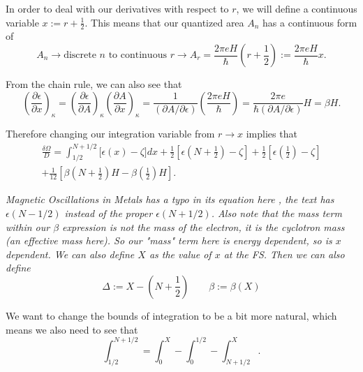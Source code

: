 \documentclass[12pt]{revtex4-2}
\begin{document}
In order to deal with our derivatives with respect to $r$, we will define a continuous variable $x := r + \frac{1}{2}$.  This means that our quantized area $A_n$ has a continuous form of
\begin{equation}
    A_n \to \text{discrete $n$ to continuous $r$} \to A_r = \frac{2\pi eH}{\hbar}\left( r + \frac{1}{2} \right) := \frac{2\pi eH}{\hbar}x.
\end{equation}

From the chain rule, we can also see that
\begin{equation}
    \left( \frac{\partial\epsilon}{\partial x} \right)_\kappa = \left( \frac{\partial\epsilon}{\partial A} \right)_\kappa \left( \frac{\partial A}{\partial x} \right)_\kappa = \frac{1}{(\partial A/\partial\epsilon)}\left( \frac{2\pi eH}{\hbar} \right) = \frac{2\pi e}{\hbar(\partial A/\partial\epsilon)}H = \beta H.
\end{equation}

Therefore changing our integration variable from $r \to x$ implies that 
\begin{multline}\label{eqn:dO-over-D-pre-expansion}
    \frac{\delta\Omega}{D} = \int_{1/2}^{N + 1/2} \big[ \epsilon(x) - \zeta \big]dx + \frac{1}{2}\left[ \epsilon\left(N + \frac{1}{2}\right) - \zeta \right] + \frac{1}{2}\left[ \epsilon\left(\frac{1}{2}\right) - \zeta \right] \\
    + \frac{1}{12}\left[ \beta\left(N + \frac{1}{2}\right)H - \beta\left(\frac{1}{2}\right)H \right].
\end{multline}

\em Magnetic Oscillations in Metals has a typo in its equation here \em, the text has $\epsilon(N - 1/2)$ instead of the proper $\epsilon(N+1/2)$.  Also note that the mass term within our $\beta$ expression is \em not \em the mass of the electron, it is the cyclotron mass (an effective mass here).  So our "mass" term here is energy dependent, so is $x$ dependent.  We can also define $X$ as the value of $x$ at the FS.  Then we can also define
\begin{equation}
    \Delta := X - \left( N + \frac{1}{2} \right) \qquad \beta := \beta(X)
\end{equation}

We want to change the bounds of integration to be a bit more natural, which means we also need to see that 
\begin{equation}
    \int_{1/2}^{N+1/2} = \int_0^X - \int_0^{1/2} - \int_{N+1/2}^X.
\end{equation}
\end{document}
